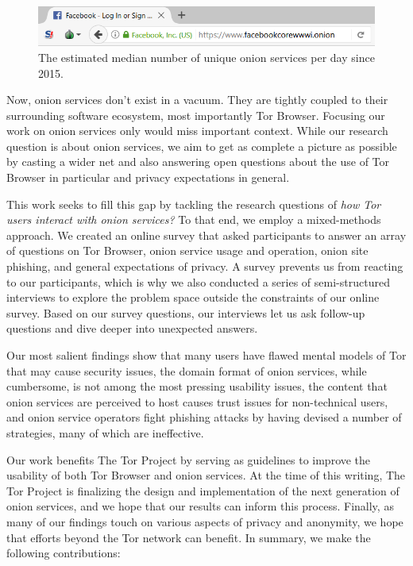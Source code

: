 \begin{figure}[t]
\includegraphics[width=\linewidth]{figures/onion-service-interface.png}
\caption{The estimated median number of unique onion services per day since
2015.}
\label{fig:os-interface}
\end{figure}

Now, onion services don't exist in a vacuum.  They are tightly coupled to their
surrounding software ecosystem, most importantly Tor Browser.  Focusing our work
on onion services only would miss important context.  While our research
question is about onion services, we aim to get as complete a picture as
possible by casting a wider net and also answering open questions about the use
of Tor Browser in particular and privacy expectations in general.

This work seeks to fill this gap by tackling the research questions of \emph{how
Tor users interact with onion services?}  To that end, we employ a mixed-methods
approach.  We created an online survey that asked participants to answer an
array of questions on Tor Browser, onion service usage and operation, onion site
phishing, and general expectations of privacy.  A survey prevents us from
reacting to our participants, which is why we also conducted a series of
semi-structured interviews to explore the problem space outside the constraints
of our online survey.  Based on our survey questions, our interviews let us ask
follow-up questions and dive deeper into unexpected answers.

Our most salient findings show that \first many users have flawed mental models
of Tor that may cause security issues, \second the domain format of onion
services, while cumbersome, is not among the most pressing usability issues,
\third the content that onion services are perceived to host causes trust issues
for non-technical users, and \fourth onion service operators fight phishing
attacks by having devised a number of strategies, many of which are ineffective.

Our work benefits The Tor Project by serving as guidelines to improve the
usability of both Tor Browser and onion services.  At the time of this writing,
The Tor Project is finalizing the design and implementation of the next
generation of onion services, and we hope that our results can inform this
process.  Finally, as many of our findings touch on various aspects of privacy
and anonymity, we hope that efforts beyond the Tor network can benefit.  In
summary, we make the following contributions:

